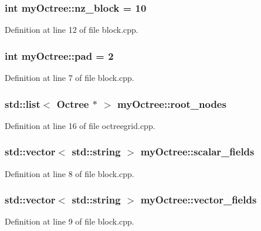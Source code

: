 \subsubsection[{nz\+\_\+block}]{\setlength{\rightskip}{0pt plus 5cm}int my\+Octree\+::nz\+\_\+block = 10}\label{namespacemy_octree_a2b2fa3a7759c3ff5b129847af3e09cc3}


Definition at line 12 of file block.\+cpp.

\hypertarget{namespacemy_octree_afd8ca344b4ea11a79b6154184cdd1eee}{}
\subsubsection[{pad}]{\setlength{\rightskip}{0pt plus 5cm}int my\+Octree\+::pad = 2}\label{namespacemy_octree_afd8ca344b4ea11a79b6154184cdd1eee}


Definition at line 7 of file block.\+cpp.

\hypertarget{namespacemy_octree_a6212186e66a32f5588c044d5ba02dabf}{}
\subsubsection[{root\+\_\+nodes}]{\setlength{\rightskip}{0pt plus 5cm}std\+::list$<$ {\bf Octree} $\ast$ $>$ my\+Octree\+::root\+\_\+nodes}\label{namespacemy_octree_a6212186e66a32f5588c044d5ba02dabf}


Definition at line 16 of file octreegrid.\+cpp.

\hypertarget{namespacemy_octree_a4f17c285302d88a975d981d6d3847e0b}{}
\subsubsection[{scalar\+\_\+fields}]{\setlength{\rightskip}{0pt plus 5cm}std\+::vector$<$ std\+::string $>$ my\+Octree\+::scalar\+\_\+fields}\label{namespacemy_octree_a4f17c285302d88a975d981d6d3847e0b}


Definition at line 8 of file block.\+cpp.

\hypertarget{namespacemy_octree_a2945780283d74e740bfa857e95f7c19a}{}
\subsubsection[{vector\+\_\+fields}]{\setlength{\rightskip}{0pt plus 5cm}std\+::vector$<$ std\+::string $>$ my\+Octree\+::vector\+\_\+fields}\label{namespacemy_octree_a2945780283d74e740bfa857e95f7c19a}


Definition at line 9 of file block.\+cpp.

